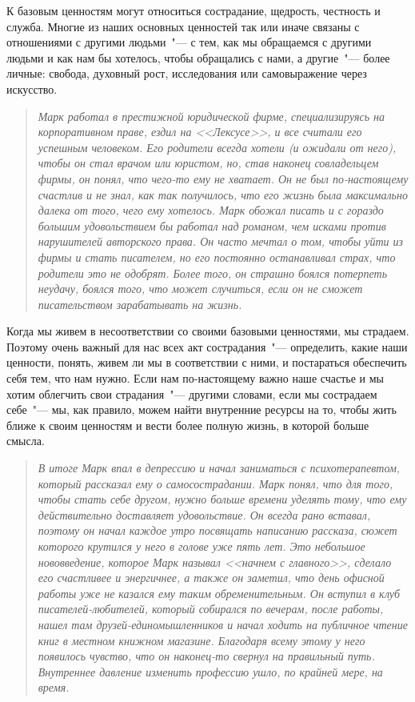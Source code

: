 К базовым ценностям могут относиться сострадание, щедрость, честность и служба. Многие из наших основных ценностей так или иначе связаны с отношениями с другими людьми~"--- с тем, как мы обращаемся с другими людьми и как нам бы хотелось, чтобы обращались с нами, а другие~"---  более личные: свобода, духовный рост, исследования или самовыражение через искусство. 

\begin{quotation}
	\textit{
		Марк работал в престижной юридической фирме, специализируясь на корпоративном праве, ездил на <<Лексусе>>, и все считали его успешным человеком. Его родители всегда хотели (и ожидали от него), чтобы он стал врачом или юристом, но, став наконец совладельцем фирмы, он понял, что чего-то ему не хватает.  Он не был по-настоящему счастлив и не знал, как так получилось, что его жизнь была максимально далека от того, чего ему хотелось. Марк обожал писать и с гораздо большим удовольствием бы работал над романом, чем исками против нарушителей авторского права.  Он часто мечтал о том, чтобы уйти из фирмы и стать писателем, но его постоянно останавливал страх, что родители это не одобрят. Более того, он страшно боялся потерпеть неудачу, боялся того, что может случиться, если он не сможет писательством зарабатывать на жизнь.
	} 
\end{quotation}

Когда мы живем в несоответствии со своими базовыми ценностями, мы страдаем. Поэтому очень важный для нас всех акт сострадания~"--- определить, какие наши ценности, понять, живем ли мы в соответствии с ними, и постараться обеспечить себя тем, что нам нужно. Если нам по-настоящему важно наше счастье и мы хотим облегчить свои страдания~"--- другими словами, если мы сострадаем себе~"--- мы, как правило, можем найти внутренние ресурсы на то, чтобы жить ближе к своим ценностям и вести более полную жизнь, в которой больше смысла. 

\begin{quotation}
	\textit{
		В итоге Марк впал в депрессию и начал заниматься с психотерапевтом, который рассказал ему о самосострадании. Марк понял, что для того, чтобы стать себе другом, нужно больше времени уделять тому, что ему действительно доставляет удовольствие. Он всегда рано вставал, поэтому он начал каждое утро посвящать написанию рассказа, сюжет которого крутился у него в голове уже пять лет. Это небольшое нововведение, которое Марк называл <<начнем с главного>>, сделало его счастливее и энергичнее, а также он заметил, что день офисной работы уже не казался ему таким обременительным. Он вступил в клуб писателей-любителей, который собирался по вечерам, после работы, нашел там друзей-единомышленников и начал ходить на публичное чтение книг в местном книжном магазине. Благодаря всему этому у него появилось чувство, что он наконец-то свернул на правильный путь. Внутреннее давление изменить профессию ушло, по крайней мере, на время.
	}
\end{quotation}


